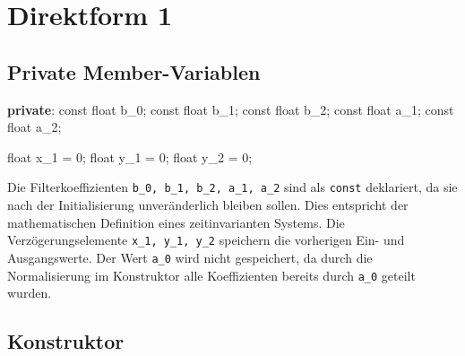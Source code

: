 \documentclass[
  ngerman,
  letterpaper,
  DIV=11]{scrreprt}
\newenvironment{Shaded}{\begin{snugshade}}{\end{snugshade}}
\newcommand{\AttributeTok}[1]{\textcolor[rgb]{0.40,0.45,0.13}{#1}}
\newcommand{\DataTypeTok}[1]{\textcolor[rgb]{0.68,0.00,0.00}{#1}}
\newcommand{\DecValTok}[1]{\textcolor[rgb]{0.68,0.00,0.00}{#1}}
\newcommand{\KeywordTok}[1]{\textcolor[rgb]{0.00,0.23,0.31}{\textbf{#1}}}
\newcommand{\NormalTok}[1]{\textcolor[rgb]{0.00,0.23,0.31}{#1}}
\newcommand{\OperatorTok}[1]{\textcolor[rgb]{0.37,0.37,0.37}{#1}}
\begin{document}
\section{Direktform 1}\label{direktform-1-1}

\subsection{Private Member-Variablen}\label{private-member-variablen}

\begin{Shaded}
\begin{Highlighting}[]
\KeywordTok{private}\OperatorTok{:}
  \AttributeTok{const} \DataTypeTok{float}\NormalTok{ b\_0}\OperatorTok{;} 
  \AttributeTok{const} \DataTypeTok{float}\NormalTok{ b\_1}\OperatorTok{;}
  \AttributeTok{const} \DataTypeTok{float}\NormalTok{ b\_2}\OperatorTok{;}
  \AttributeTok{const} \DataTypeTok{float}\NormalTok{ a\_1}\OperatorTok{;}
  \AttributeTok{const} \DataTypeTok{float}\NormalTok{ a\_2}\OperatorTok{;}

  \DataTypeTok{float}\NormalTok{ x\_1 }\OperatorTok{=} \DecValTok{0}\OperatorTok{;}
  \DataTypeTok{float}\NormalTok{ y\_1 }\OperatorTok{=} \DecValTok{0}\OperatorTok{;}
  \DataTypeTok{float}\NormalTok{ y\_2 }\OperatorTok{=} \DecValTok{0}\OperatorTok{;}
\end{Highlighting}
\end{Shaded}

Die Filterkoeffizienten \texttt{b\_0,\ b\_1,\ b\_2,\ a\_1,\ a\_2} sind
als \texttt{const} deklariert, da sie nach der Initialisierung
unveränderlich bleiben sollen. Dies entspricht der mathematischen
Definition eines zeitinvarianten Systems. Die Verzögerungselemente
\texttt{x\_1,\ y\_1,\ y\_2} speichern die vorherigen Ein- und
Ausgangswerte. Der Wert \texttt{a\_0} wird nicht gespeichert, da durch
die Normalisierung im Konstruktor alle Koeffizienten bereits durch
\texttt{a\_0} geteilt wurden.

\subsection{Konstruktor}\label{konstruktor}
\end{document}
